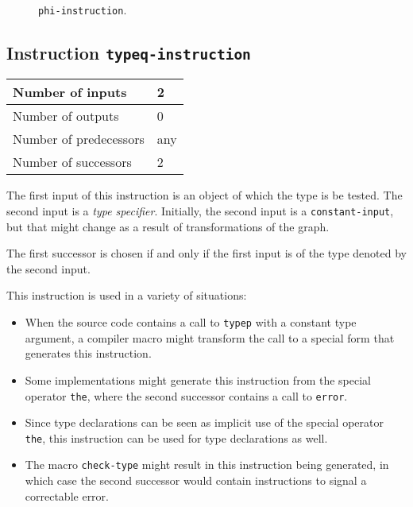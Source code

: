 \begin{figure}
\begin{center}
\end{center}
\caption{\label{fig-phi-instruction}
\texttt{phi-instruction}.}
\end{figure}

\subsection{Instruction \texttt{typeq-instruction}}
\label{mir-instruction-typeq}

\begin{tabular}{|l|l|}
\hline
Number of inputs & 2\\
\hline
Number of outputs & 0\\
\hline
Number of predecessors & any\\
\hline
Number of successors & 2\\
\hline
\end{tabular}

The first input of this instruction is an object of which the type
is be tested.  The second input is a \emph{type specifier}.
Initially, the second input is a \texttt{constant-input}, but that
might change as a result of transformations of the graph.  

The first successor is chosen if and only if the first input is of the
type denoted by the second input. 

This instruction is used in a variety of situations:

\begin{itemize}
\item When the source code contains a call to \texttt{typep} with a
  constant type argument, a compiler macro might transform the call to
  a special form that generates this instruction.
\item Some implementations might generate this instruction from the
  special operator \texttt{the}, where the second successor contains a
  call to \texttt{error}.
\item Since type declarations can be seen as implicit use of the
  special operator \texttt{the}, this instruction can be used for type
  declarations as well.
\item The macro \texttt{check-type} might result in this instruction
  being generated, in which case the second successor would contain
  instructions to signal a correctable error.
\end{itemize}

